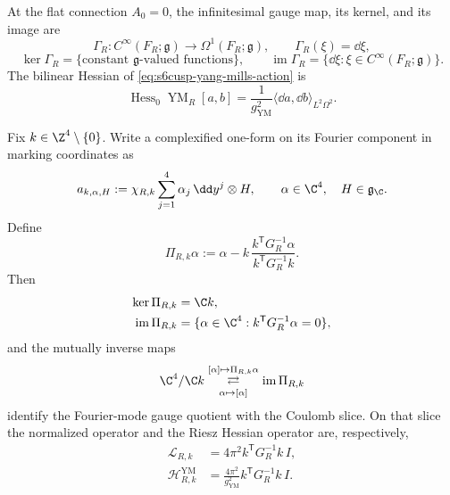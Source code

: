 \begin{theorem}
\label{thm:s6cusp-flat-gauge-hessian}
At the flat connection \(A_0=0\), the infinitesimal gauge map, its kernel,
and its image are
\begin{equation}\label{eq:s6cusp-infinitesimal-gauge-map}
 \Gamma_R:C^\infty(F_R;\mathfrak g)
 \longrightarrow\Omega^1(F_R;\mathfrak g),
 \qquad
 \Gamma_R(\xi)=\dd\xi,
\end{equation}
\[
 \ker\Gamma_R=
 \{\text{constant \(\mathfrak g\)-valued functions}\},
 \qquad
 \operatorname{im}\Gamma_R=
 \{\dd\xi:\xi\in C^\infty(F_R;\mathfrak g)\}.
\]
The bilinear Hessian of \eqref{eq:s6cusp-yang-mills-action} is
\begin{equation}\label{eq:s6cusp-flat-yang-mills-bilinear-hessian}
 \operatorname{Hess}_{0}\operatorname{YM}_R[a,b]
 =\frac1{g_{\mathrm{YM}}^2}
 \langle\dd a,\dd b\rangle_{L^2\Omega^2}.
\end{equation}

Fix \(k\in\Z^4\setminus\{0\}\).  Write a complexified one-form on its
Fourier component in marking coordinates as
\[
 a_{k,\alpha,H}:=
 \chi_{R,k}\sum_{j=1}^4\alpha_j\,\dd y^j\otimes H,
 \qquad
 \alpha\in\C^4,\quad H\in\mathfrak g_{\C}.
\]
Define
\begin{equation}\label{eq:s6cusp-coulomb-projection}
 \Pi_{R,k}\alpha:=
 \alpha-k\,
 \frac{k^{\mathsf T}G_R^{-1}\alpha}
 {k^{\mathsf T}G_R^{-1}k}.
\end{equation}
Then
\begin{align}
 \ker\Pi_{R,k}&=\C k,\label{eq:s6cusp-coulomb-kernel}\\
 \operatorname{im}\Pi_{R,k}
 &=\{\alpha\in\C^4:
 k^{\mathsf T}G_R^{-1}\alpha=0\},
 \label{eq:s6cusp-coulomb-image}
\end{align}
and the mutually inverse maps
\begin{equation}\label{eq:s6cusp-coulomb-quotient-isomorphism}
 \C^4/\C k
 \underset{\alpha\mapsto[\alpha]}{\overset{[\alpha]\mapsto
 \Pi_{R,k}\alpha}{\rightleftarrows}}
 \operatorname{im}\Pi_{R,k}
\end{equation}
identify the Fourier-mode gauge quotient with the Coulomb slice.
On that slice the normalized operator and the Riesz Hessian operator are,
respectively,
\begin{align}
 \mathcal L_{R,k}
 &=4\pi^2 k^{\mathsf T}G_R^{-1}k\,I,
 \label{eq:s6cusp-normalized-flat-hessian}\\
 \mathcal H_{R,k}^{\mathrm{YM}}
 &=\frac{4\pi^2}{g_{\mathrm{YM}}^2}
 k^{\mathsf T}G_R^{-1}k\,I.
 \label{eq:s6cusp-riesz-flat-hessian}
\end{align}
\end{theorem}

